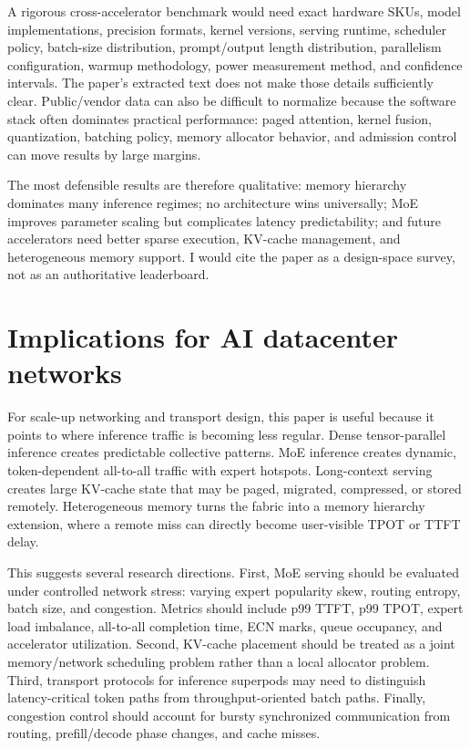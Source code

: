 \documentclass[10pt]{article}
\begin{document}
A rigorous cross-accelerator benchmark would need exact hardware SKUs, model implementations, precision formats, kernel versions, serving runtime, scheduler policy, batch-size distribution, prompt/output length distribution, parallelism configuration, warmup methodology, power measurement method, and confidence intervals. The paper's extracted text does not make those details sufficiently clear. Public/vendor data can also be difficult to normalize because the software stack often dominates practical performance: paged attention, kernel fusion, quantization, batching policy, memory allocator behavior, and admission control can move results by large margins.

The most defensible results are therefore qualitative: memory hierarchy dominates many inference regimes; no architecture wins universally; MoE improves parameter scaling but complicates latency predictability; and future accelerators need better sparse execution, KV-cache management, and heterogeneous memory support. I would cite the paper as a design-space survey, not as an authoritative leaderboard.

\section{Implications for AI datacenter networks}
For scale-up networking and transport design, this paper is useful because it points to where inference traffic is becoming less regular. Dense tensor-parallel inference creates predictable collective patterns. MoE inference creates dynamic, token-dependent all-to-all traffic with expert hotspots. Long-context serving creates large KV-cache state that may be paged, migrated, compressed, or stored remotely. Heterogeneous memory turns the fabric into a memory hierarchy extension, where a remote miss can directly become user-visible TPOT or TTFT delay.

This suggests several research directions. First, MoE serving should be evaluated under controlled network stress: varying expert popularity skew, routing entropy, batch size, and congestion. Metrics should include p99 TTFT, p99 TPOT, expert load imbalance, all-to-all completion time, ECN marks, queue occupancy, and accelerator utilization. Second, KV-cache placement should be treated as a joint memory/network scheduling problem rather than a local allocator problem. Third, transport protocols for inference superpods may need to distinguish latency-critical token paths from throughput-oriented batch paths. Finally, congestion control should account for bursty synchronized communication from routing, prefill/decode phase changes, and cache misses.
\end{document}
